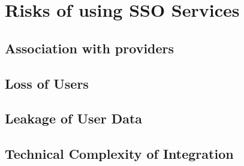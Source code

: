 \newpage

\section{Risks of using \ac{SSO} Services}

\subsection{Association with providers}

\subsection{Loss of Users}

\subsection{Leakage of User Data}

\subsection{Technical Complexity of Integration}





